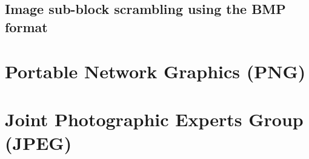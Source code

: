 \begin{multicols*}{2}
\subsection{Image sub-block scrambling using the BMP format}

\section{Portable Network Graphics (PNG)} \label{PNG_Explained_Chapter}

\section{Joint Photographic Experts Group (JPEG)} \label{JPEG_Explained_Chapter}

\end{multicols*}